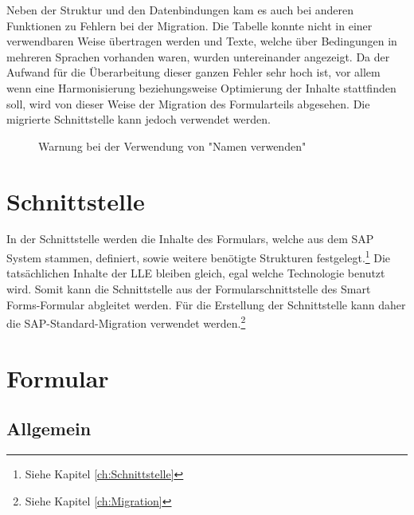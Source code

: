 Neben der Struktur und den Datenbindungen kam es auch bei anderen Funktionen zu Fehlern bei der Migration. Die Tabelle konnte nicht in einer verwendbaren Weise übertragen werden und Texte, welche über Bedingungen in mehreren Sprachen vorhanden waren, wurden untereinander angezeigt. Da der Aufwand für die Überarbeitung dieser ganzen Fehler sehr hoch ist, vor allem wenn eine Harmonisierung beziehungsweise Optimierung der Inhalte stattfinden soll, wird von dieser Weise der Migration des Formularteils abgesehen. Die migrierte Schnittstelle kann jedoch verwendet werden. 
\begin{figure}[ht]
	\centering
	\caption{Warnung bei der Verwendung von "Namen verwenden"}
	\label{Namen-Fehler}
\end{figure}

\section{Schnittstelle}

In der Schnittstelle werden die Inhalte des Formulars, welche aus dem SAP System stammen, definiert, sowie weitere benötigte Strukturen festgelegt.\footnote{Siehe Kapitel \ref{ch:Schnittstelle}}
Die tatsächlichen Inhalte der \ac{LLE} bleiben gleich, egal welche Technologie benutzt wird. Somit kann die Schnittstelle aus der Formularschnittstelle des Smart Forms-Formular abgleitet werden. Für die Erstellung der Schnittstelle kann daher die SAP-Standard-Migration verwendet werden.\footnote{Siehe Kapitel \ref{ch:Migration}}


\section{Formular}

\subsection{Allgemein}

